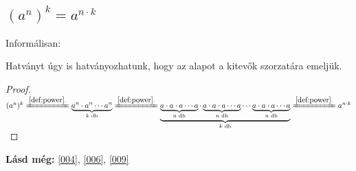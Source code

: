 \subsection{\texorpdfstring{$(a^n)^k = a^{n \cdot k}$}{(a**n)**k = a**(n * k)}}
\label{theo:powerpow}
Informálisan:

Hatványt úgy is hatványozhatunk, hogy az alapot a kitevők szorzatára emeljük.

\begin{proof}

$(a^n)^k
 \xlongequal{\ref{def:power}.}
 \underbrace{a^n \cdot a^n \dotsm a^n}_{k \text{ db}} 
 \xlongequal{\ref{def:power}.}
 \underbrace{\underbrace{a \cdot a \cdot a \dotsm a}_{n \text{ db}}
   \cdot \underbrace{a \cdot a \cdot a \dotsm a}_{n \text{ db}} \dotsm
   \underbrace{a \cdot a \cdot a \dotsm a}_{n \text{ db}}}_{k \text{ db}}
 \xlongequal{\ref{def:power}.} a^{n \cdot k}
$
\end{proof}

\textbf{Lásd még:} \ref{004}, \ref{006}, \ref{009}
